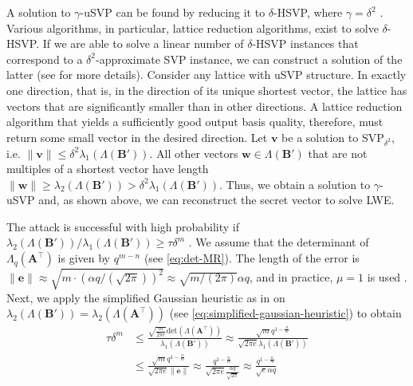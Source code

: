 A solution to $\gamma$-uSVP can be found by reducing it to $\delta$-HSVP, where $\gamma = \delta^2$ \cite{APS15}. Various algorithms, in particular, lattice reduction algorithms, exist to solve $\delta$-HSVP. If we are able to solve a linear number of $\delta$-HSVP instances that correspond to a $\delta^2$-approximate SVP instance, we can construct a solution of the latter (see \cite[Section~1.2.21]{Lov87} for more details).
Consider any lattice with uSVP structure. In exactly one direction, that is, in the direction of its unique shortest vector, the lattice has vectors that are significantly smaller than in other directions. A lattice reduction algorithm that yields a sufficiently good output basis quality, therefore, must return some small vector in the desired direction.
Let $\mathbf{v}$ be a solution to SVP$_{\delta^2}$, i.e. $\|\mathbf{v}\| \leq \delta^2 \lambda_1(\Lambda(\mathbf{B}'))$. All other vectors $\mathbf{w}\in \Lambda(\mathbf{B}')$ that are not multiples of a shortest vector have length $\|\mathbf{w}\| \geq \lambda_2(\Lambda(\mathbf{B}')) > \delta^2\lambda_1(\Lambda(\mathbf{B}'))$. Thus, we obtain a solution to $\gamma$-uSVP and, as shown above, we can reconstruct the secret vector to solve LWE.

The attack is successful with high probability if $\lambda_2(\Lambda(\mathbf{B}'))/\lambda_1(\Lambda(\mathbf{B}')) \geq \tau \delta^m$ \cite{AFG13}. We assume that the determinant of $\Lambda_q(\mathbf{A}^\intercal)$ is given by $q^{m-n}$ (see \cref{eq:det-MR}). The length of the error is $\|\mathbf{e}\| \approx \sqrt{m\cdot \left(\alpha q / (\sqrt{2\pi})\right)^2} \approx \sqrt{m / (2\pi)} \alpha q$, and in practice, $\mu=1$ is used \cite{APS15}. Next, we apply the simplified Gaussian heuristic as in \cite{Gop16} on $\lambda_2(\Lambda(\mathbf{B}'))=\lambda_2(\Lambda(\mathbf{A}^\intercal))$ (see \cref{eq:simplified-gaussian-heuristic}) to obtain
\begin{align*}
  \tau \delta^m & \leq \frac{ \sqrt{\frac{m}{2\pi e}} \text{det}(\Lambda(\mathbf{A}^\intercal))}{\lambda_1(\Lambda(\mathbf{B}'))} \approx \frac{\sqrt{m} q^{1-\frac{n}{m}}}{\sqrt{2\pi e} \lambda_1(\Lambda(\mathbf{B}'))} \\ &\leq \frac{\sqrt{m} q^{1-\frac{n}{m}}}{\sqrt{2\pi e} \|\mathbf{e}\|} \approx \frac{q^{1-\frac{n}{m}}}{\sqrt{2\pi e}  \frac{\alpha q}{\sqrt{2\pi}}} \approx \frac{q^{1-\frac{n}{m}}}{\sqrt{e} \alpha q}
\end{align*}

